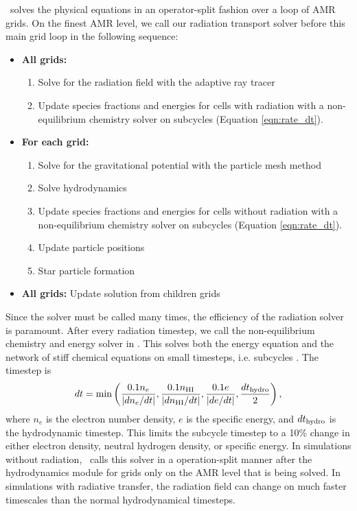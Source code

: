 \documentclass[useAMS,usenatbib]{mn2e}
\begin{document}
\enzo~solves the physical equations in an operator-split fashion over
a loop of AMR grids.  On the finest AMR level, we call our radiation
transport solver before this main grid loop in the following sequence:
\begin{itemize}
\item \textbf{All grids:}
  \begin{enumerate}
  \item Solve for the radiation field with the adaptive ray tracer
  \item Update species fractions and energies for cells with radiation
    with a non-equilibrium chemistry solver on subcycles (Equation
    \ref{eqn:rate_dt}).
  \end{enumerate}
\item \textbf{For each grid:}
  \begin{enumerate}
  \item Solve for the gravitational potential with the particle mesh
    method
  \item Solve hydrodynamics
  \item Update species fractions and energies for cells without
    radiation with a non-equilibrium chemistry solver on subcycles
    (Equation \ref{eqn:rate_dt}).
  \item Update particle positions
  \item Star particle formation
  \end{enumerate}
\item \textbf{All grids:} Update solution from children grids
\end{itemize}
%

Since the solver must be called many times, the efficiency of the
radiation solver is paramount.  After every radiation timestep, we
call the non-equilibrium chemistry and energy solver in \enzo.  This
solves both the energy equation and the network of stiff chemical
equations on small timesteps, i.e. subcycles \citep{Anninos97}.  The
timestep is
%
\begin{equation}
  \label{eqn:rate_dt}
  dt = \min\left(
    \frac{0.1n_e}{|dn_e/dt|}, 
    \frac{0.1n_{\rm HI}}{|dn_{\rm HI}/dt|}, 
    \frac{0.1e}{|de/dt|}, 
    \frac{dt_{\rm hydro}}{2}\right),
\end{equation}
where $n_e$ is the electron number density, $e$ is the specific
energy, and $dt_{\rm hydro}$ is the hydrodynamic timestep.  This
limits the subcycle timestep to a 10\% change in either electron
density, neutral hydrogen density, or specific energy.  In simulations
without radiation, \enzo~calls this solver in a operation-split manner
after the hydrodynamics module for grids only on the AMR level that is
being solved.  In simulations with radiative transfer, the radiation
field can change on much faster timescales than the normal
hydrodynamical timesteps.
\end{document}
